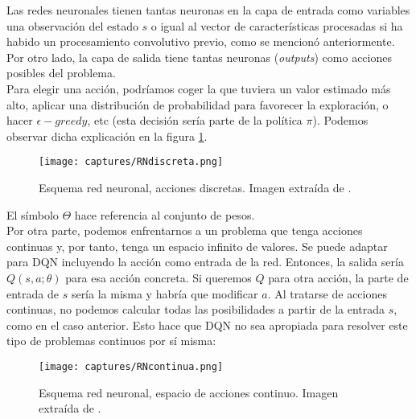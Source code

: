 \documentclass[11pt,fleqn]{book} %
\begin{document}

Las redes neuronales tienen tantas neuronas en la capa de entrada como variables una observación del estado $s$ o igual al vector de características procesadas si ha habido un procesamiento convolutivo previo, como se mencionó anteriormente. Por otro lado, la capa de salida tiene tantas neuronas (\textit{outputs}) como acciones posibles del problema. \\

Para elegir una acción, podríamos coger la que tuviera un valor estimado más alto, aplicar una distribución de probabilidad para favorecer la exploración, o hacer $\epsilon-greedy$, etc (esta decisión sería parte de la política $\pi$). Podemos observar dicha explicación en la figura \ref{fig:RNdiscreta}.

\begin{figure}[H]
	\centering\texttt{[image: captures/RNdiscreta.png]}
	\caption{Esquema red neuronal, acciones discretas. Imagen extraída de \cite{article:RLromero}.}
	\label{fig:RNdiscreta} %
\end{figure}

El símbolo $\Theta$ hace referencia al conjunto de pesos. \\

Por otra parte, podemos enfrentarnos a un problema que tenga acciones continuas y, por tanto, tenga un espacio infinito de valores. Se puede adaptar para DQN incluyendo la acción como entrada de la red. Entonces, la salida sería $Q(s,a;\theta)$ para esa acción concreta. Si queremos $Q$ para otra acción, la parte de entrada de $s$ sería la misma y habría que modificar $a$. Al tratarse de acciones continuas, no podemos calcular todas las posibilidades a partir de la entrada $s$, como en el caso anterior. Esto hace que DQN no sea apropiada para resolver este tipo de problemas continuos por sí misma:

\begin{figure}[H]
	\centering\texttt{[image: captures/RNcontinua.png]}
	\caption{Esquema red neuronal, espacio de acciones continuo. Imagen extraída de \cite{article:RLromero}.}
	\label{fig:RNcontinua} %
\end{figure}
\end{document}
